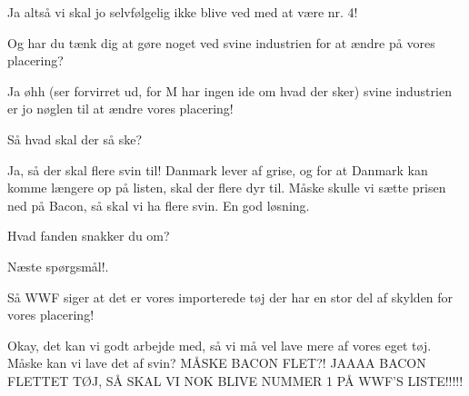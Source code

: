 \documentclass[a4paper,11pt]{article}
\begin{document}
\begin{sketch}
 Ja altså vi skal jo selvfølgelig ikke blive ved med at være nr. 4!

 Og har du tænk dig at gøre noget ved svine industrien for at ændre på vores placering?

 Ja øhh (ser forvirret ud, for M har ingen ide om hvad der sker) svine industrien er jo nøglen til at ændre vores placering!

 Så hvad skal der så ske?

 Ja, så der skal flere svin til! Danmark lever af grise, og for at Danmark kan komme længere op på listen, skal der flere dyr til. Måske skulle vi sætte prisen ned på Bacon, så skal vi ha flere svin. En god løsning.

 Hvad fanden snakker du om?

 Næste spørgsmål!.

 Så WWF siger at det er vores importerede tøj der har en stor del af skylden for vores placering!

 Okay, det kan vi godt arbejde med, så vi må vel lave mere af vores eget tøj. Måske kan vi lave det af svin? MÅSKE BACON FLET?! JAAAA BACON FLETTET TØJ, SÅ SKAL VI NOK BLIVE NUMMER 1 PÅ WWF'S LISTE!!!!!


\end{sketch}
\end{document}
